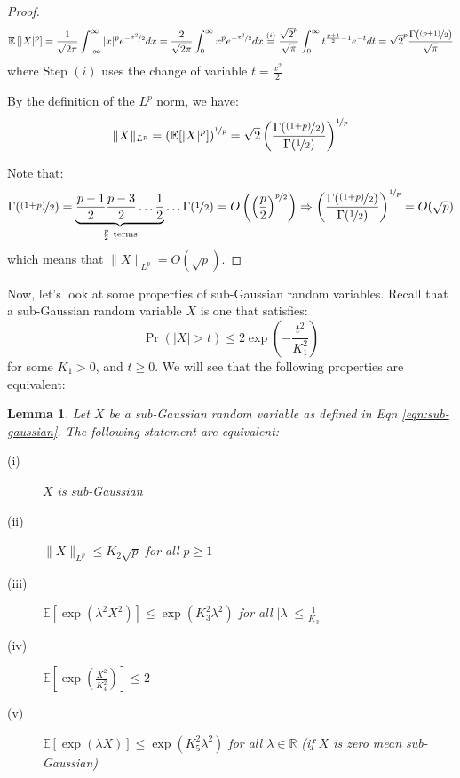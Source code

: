 \documentclass{article}
\newtheorem{lemma}{Lemma}[subsection]
\theoremstyle{remark}
\newcommand{\real}{\mathbb{R}}
\newcommand{\Exp}{\mathbb{E}}
\begin{document}
\begin{proof}
\begin{equation*}
\Exp\left[|X|^{p}\right] = \frac{1}{\sqrt{2\pi}}\int_{-\infty}^{\infty} |x|^{p}e^{-\nicefrac{x^{2}}{2}} dx = \frac{2}{\sqrt{2\pi}}\int_{0}^{\infty} x^{p}e^{-\nicefrac{x^{2}}{2}} dx \overset{(i)}= \frac{\sqrt{2}^{p}}{\sqrt{\pi}}\int_{0}^{\infty} t^{\frac{p+1}{2} - 1} e^{-t} dt = \sqrt{2}^{p}\frac{\Gamma(\nicefrac{(p + 1)}{2})}{\sqrt{\pi}}
\end{equation*}
where Step \((i)\) uses the change of variable \(t = \frac{x^{2}}{2}\)

By the definition of the \(L^{p}\) norm, we have:
\begin{equation*}
\|X\|_{L^{p}} = \left(\Exp[|X|^{p}]\right)^{\nicefrac{1}{p}} = \sqrt{2}\left(\frac{\Gamma(\nicefrac{(1 + p)}{2})}{\Gamma(\nicefrac{1}{2})}\right)^{\nicefrac{1}{p}}
\end{equation*}

Note that:
\begin{equation*}
\Gamma(\nicefrac{(1 + p)}{2}) = \underbrace{\frac{p - 1}{2}\frac{p - 3}{2}\ldots\frac{1}{2}}_{\frac{p}{2} \text{ terms}}\ldots\Gamma(\nicefrac{1}{2}) = O\left(\left(\frac{p}{2}\right)^{\nicefrac{p}{2}}\right) \Rightarrow \left(\frac{\Gamma(\nicefrac{(1 + p)}{2})}{\Gamma(\nicefrac{1}{2})}\right)^{\nicefrac{1}{p}} = O(\sqrt{p})
\end{equation*}
which means that \(\|X\|_{L^{p}} = O(\sqrt{p})\).
\end{proof}

Now, let's look at some properties of sub-Gaussian random variables. Recall that a sub-Gaussian random variable \(X\) is one that satisfies:
\begin{equation}
\label{eqn:sub-gaussian}
\Pr(|X| > t) \leq 2\exp\left(-\frac{t^{2}}{K_{1}^{2}}\right)
\end{equation}
for some \(K_{1} > 0\), and \(t \geq 0\). We will see that the following properties are equivalent:
\begin{lemma}
Let \(X\) be a sub-Gaussian random variable as defined in Eqn \ref{eqn:sub-gaussian}. The following statement are equivalent:
\begin{description}
\item [(i)] \(X\) is sub-Gaussian
\item [(ii)] \(\|X\|_{L^{p}} \leq K_{2}\sqrt{p}\) for all \(p \geq 1\)
\item [(iii)] \(\Exp[\exp(\lambda^{2}X^{2})] \leq \exp(K_{3}^{2}\lambda^{2})\) for all \(|\lambda| \leq \frac{1}{K_{3}}\)
\item [(iv)] \(\Exp\left[\exp\left(\frac{X^{2}}{K_{4}^{2}}\right)\right] \leq 2\)
\item [(v)] \(\Exp\left[\exp(\lambda X)\right] \leq \exp(K_{5}^{2}\lambda^{2})\) for all \(\lambda \in \real\) (if \(X\) is zero mean sub-Gaussian)
\end{description}
\end{lemma}
\end{document}
